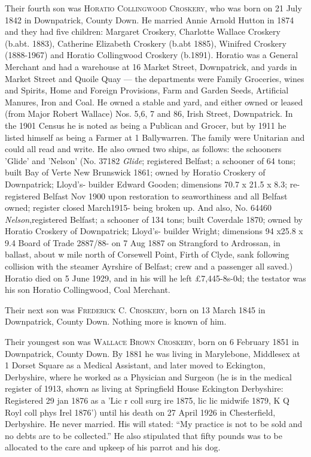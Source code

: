 Their fourth son was \textsc{Horatio Collingwood Croskery}, who was born on	21 July 1842 in Downpatrick, County Down. He married Annie Arnold Hutton in 1874 and they had five children: Margaret Croskery, Charlotte Wallace Croskery (b.abt. 1883), 
Catherine Elizabeth Croskery (b.abt 1885), Winifred Croskery (1888-1967) and Horatio Collingwood Croskery (b.1891).  Horatio was a General Merchant and had a warehouse at 16 Market Street, Downpatrick, and yards in Market Street and Quoile Quay — the departments were Family Groceries, wines and Spirits, Home and Foreign Provisions, Farm and Garden Seeds, Artificial Manures, Iron and Coal. He owned a stable and yard, and either owned or leased (from Major Robert Wallace) Nos. 5,6, 7 and 86, Irish Street, Downpatrick. In the 1901 Census he is noted as being a Publican and Grocer, but by 1911 he listed himself as being a Farmer at 1 Ballywarren. The family were Unitarian and could all read and write. He also owned two ships, as follows:  the schooners 'Glide' and 'Nelson' (No. 37182 \textit{Glide}; registered Belfast; a schooner of 64 tons; built Bay of Verte New Brunswick 1861; owned by Horatio Croskery of Downpatrick; Lloyd’s- builder Edward Gooden; dimensions 70.7 x 21.5 x 8.3; re-registered Belfast Nov 1900 upon restoration to seaworthiness and all Belfast owned; register closed March1915- being broken up. And also, No. 64460 \textit{Nelson},registered Belfast; a schooner of 134 tons; built Coverdale 1870; owned by Horatio Croskery of Downpatrick; Lloyd’s- builder Wright; dimensions 94 x25.8 x 9.4 Board of Trade 2887/88- on 7 Aug 1887 on Strangford to Ardrossan, in ballast, about w mile north of Corsewell Point, Firth of Clyde, sank following collision with the steamer Ayrshire of Belfast; crew and a passenger all saved.)   Horatio died on 5 June 1929, and in his will he left £7,445-8s-0d; the testator was his son Horatio Collingwood, Coal Merchant. 

Their next son was \textsc{Frederick C. Croskery}, born on 13 March 1845 in Downpatrick, County Down. Nothing more is known of him.

Their youngest son was \textsc{Wallace Brown Croskery}, born on 6 February 1851 in Downpatrick, County Down.  By 1881 he was living in Marylebone, Middlesex at 1 Dorset Square as a Medical Assistant, and later moved to Eckington, Derbyshire, where he worked as a Physician and Surgeon  (he is in the medical register of 1913, shown as living at Springfield House Eckington Derbyshire: Registered 29 jan 1876 as a 'Lic r coll surg ire 1875, lic lic midwife 1879, K Q Royl coll phys Irel 1876') until his death on 27 April 1926 in Chesterfield, Derbyshire. He never married.  His will stated: ``My practice is not to be sold and no debts are to be collected.''  He also stipulated that fifty pounds was to be allocated to the care and upkeep of his parrot and his dog.



